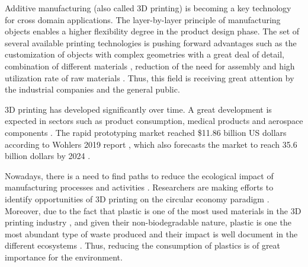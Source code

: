 \documentclass[]{interact}
\theoremstyle{plain}%
\theoremstyle{definition}
\theoremstyle{remark}
\begin{document}
Additive manufacturing (also called 3D printing) is becoming a key
technology for cross domain applications. The layer-by-layer principle
of manufacturing objects enables a higher flexibility degree in the
product design phase. The set of several available printing technologies
is pushing forward advantages such as the customization of objects with
complex geometries with a great deal of detail, combination of different
materials \citep{Askari2020}, reduction of the need for assembly and
high utilization rate of raw materials \citep{Perez2020, Wang2020f}.
Thus, this field is receiving great attention by the industrial
companies and the general public.

3D printing has developed significantly over time. A great development
is expected in sectors such as product consumption, medical products and
aerospace components \citep{Peng2018}. The rapid prototyping market
reached \$11.86 billion US dollars according to Wohlers 2019 report
\citep{Singh2021}, which also forecasts the market to reach 35.6 billion
dollars by 2024 \citep{Forbes2020}.

Nowadays, there is a need to find paths to reduce the ecological impact
of manufacturing processes and activities \citep{Niaki2019}. Researchers
are making efforts to identify opportunities of 3D printing on the
circular economy paradigm \citep{Despeisse2016}. Moreover, due to the
fact that plastic is one of the most used materials in the 3D printing
industry \citep{GonzalezHenriquez2019}, and given their
non-biodegradable nature, plastic is one the most abundant type of waste
produced and their impact is well document in the different ecosystems
\citep{Ryberg2019}. Thus, reducing the consumption of plastics is of
great importance for the environment.
\end{document}

